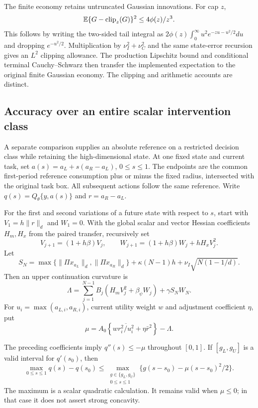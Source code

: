 The finite economy retains untruncated Gaussian innovations. For cap $z$,
\[
 \mathbb E\{G-\operatorname{clip}_{z}(G)\}^2
       \leq 4\phi(z)/z^3.
\]
This follows by writing the two-sided tail integral as
$2\phi(z)\int_0^\infty u^2e^{-zu-u^2/2}du$ and dropping
$e^{-u^2/2}$. Multiplication by $\nu_I^2+\nu_C^2$ and the
same state-error recursion gives an $L^2$ clipping allowance. The
production Lipschitz bound and conditional terminal Cauchy--Schwarz
then transfer the implemented expectation to the original finite
Gaussian economy. The clipping and arithmetic accounts are distinct.

\subsection{Accuracy over an entire scalar intervention class}
\label{app:r16menuaccuracy}

A separate comparison supplies an absolute reference on a restricted
decision class while retaining the high-dimensional state. At one fixed
state and current task, set $a(s)=a_L+s(a_R-a_L)$, $0\leq s\leq1$.
The endpoints are the common first-period reference consumption plus
or minus the fixed radius, intersected with the original task box.
All subsequent actions follow the same reference. Write
$q(s)=Q_\theta\{y,a(s)\}$ and $r=a_R-a_L$.

For the first and second variations of a future state with respect to
$s$, start with $V_1=h\|r\|_d$ and $W_1=0$. With the global
scalar and vector Hessian coefficients $H_m,H_x$ from the paired
transfer, recursively set
\[
 V_{j+1}=(1+h\beta)V_j,\qquad
 W_{j+1}=(1+h\beta)W_j+hH_xV_j^2.
\]
Let
\[
 S_N=\max\{\|\Pi x_{a_L}\|_d,\|\Pi x_{a_R}\|_d\}
          +\kappa(N-1)h+\nu_I\sqrt{N(1-1/d)}.
\]
Then an upper continuation curvature is
\[
 \Lambda=\sum_{j=1}^{N-1}B_j(H_mV_j^2+\beta_\psi W_j)
                                         +\gamma S_NW_N.
\]
For $u_i=\max(a_{L,i},a_{R,i})$, current utility weight $w$ and
adjustment coefficient $\eta$, put
\[
 \mu=A_0\left\{w\overline{r_i^2/u_i^2}+\eta\bar r^2\right\}-\Lambda.
\]

\begin{proposition}
\label{prop:r16menugap}
The preceding coefficients imply $q''(s)\leq-\mu$ throughout
$[0,1]$. If $[g_L,g_U]$ is a valid interval for $q'(s_0)$, then
\[
 \max_{0\leq s\leq1}q(s)-q(s_0)
 \leq\max_{\substack{g\in\{g_L,g_U\}\\0\leq s\leq1}}
           \{g(s-s_0)-\mu(s-s_0)^2/2\}.
\]
The maximum is a scalar quadratic calculation. It remains valid when
$\mu\leq0$; in that case it does not assert strong concavity.
\end{proposition}


